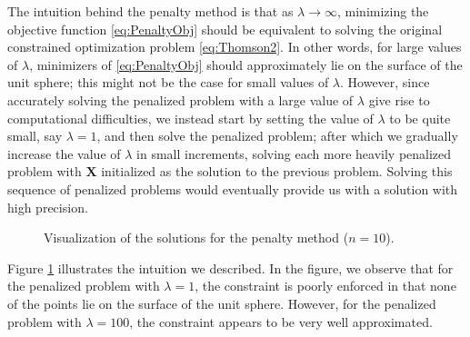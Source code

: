 \documentclass[11pt]{article}
\begin{document}
The intuition behind the penalty method is that as $\lambda\to\infty$, minimizing the objective function \eqref{eq:PenaltyObj} should be equivalent to solving the original constrained optimization problem \eqref{eq:Thomson2}. In other words, for large values of $\lambda$, minimizers of \eqref{eq:PenaltyObj} should approximately lie on the surface of the unit sphere; this might not be the case for small values of $\lambda$. However, since accurately solving the penalized problem with a large value of $\lambda$ give rise to computational difficulties, we instead start by setting the value of $\lambda$ to be quite small, say $\lambda=1$, and then solve the penalized problem; after which we gradually increase the value of $\lambda$ in small increments, solving each more heavily penalized problem with $\bm{X}$ initialized as the solution to the previous problem. Solving this sequence of penalized problems would eventually provide us with a solution with high precision.

\begin{figure}[!htb]
  \centering
  \caption{Visualization of the solutions for the penalty method ($n=10$).}
  \label{fig:PenaltyResults}
\end{figure}

Figure \ref{fig:PenaltyResults} illustrates the intuition we described. In the figure, we observe that for the penalized problem with $\lambda=1$, the constraint is poorly enforced in that none of the points lie on the surface of the unit sphere. However, for the penalized problem with $\lambda=100$, the constraint appears to be very well approximated.
\end{document}
